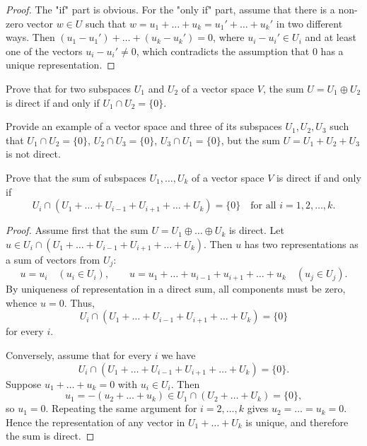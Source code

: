 \begin{proof}
    The "if" part is obvious. For the "only if" part, assume that there is a non-zero vector $w \in U$ such that $w = u_1 + \dots + u_k = u_1' + \dots + u_k'$ in two different ways. Then $(u_1 - u_1') + \dots + (u_k - u_k') = 0$, where $u_i - u_i' \in U_i$ and at least one of the vectors $u_i - u_i' \neq 0$, which contradicts the assumption that $0$ has a unique representation.
\end{proof}

\begin{exercise}
Prove that for two subspaces $U_1$ and $U_2$ of a vector space $V$, the sum $U = U_1 \oplus U_2$ is direct if and only if $U_1 \cap U_2 = \{0\}$.
\end{exercise}

\begin{exercise}
Provide an example of a vector space and three of its subspaces $U_1, U_2, U_3$ such that $U_1\cap U_2 = \{0\}$, $U_2\cap U_3 = \{0\}$, $U_3\cap U_1 = \{0\}$, but the sum $U = U_1+ U_2+ U_3$ is not direct.
\end{exercise}

\begin{lemma}
    Prove that the sum of subspaces $U_1, \ldots, U_k$ of a vector space $V$ is direct if and only if 
    $$
    U_i \cap (U_1 + \dots + U_{i - 1} + U_{i+1} + \dots + U_k) = \{0\} \quad \text{for all } i = 1, 2, \dots, k.
    $$
\end{lemma}

\begin{proof}
Assume first that the sum $U = U_1 \oplus \dots \oplus U_k$ is direct. Let $u \in U_i \cap (U_1 + \dots + U_{i-1} + U_{i+1} + \dots + U_k)$. Then $u$ has two representations as a sum of vectors from $U_j$:
$$
u = u_i \quad (u_i \in U_i), \qquad
u = u_1 + \dots + u_{i-1} + u_{i+1} + \dots + u_k \quad (u_j \in U_j).
$$
By uniqueness of representation in a direct sum, all components must be zero, whence $u = 0$. Thus,
$$
U_i \cap (U_1 + \dots + U_{i-1} + U_{i+1} + \dots + U_k) = \{0\}
$$
for every $i$.

Conversely, assume that for every $i$ we have
$$
U_i \cap (U_1 + \dots + U_{i-1} + U_{i+1} + \dots + U_k) = \{0\}.
$$
Suppose $u_1 + \dots + u_k = 0$ with $u_i \in U_i$. Then
$$
u_1 = -(u_2 + \dots + u_k) \in U_1 \cap (U_2 + \dots + U_k) = \{0\},
$$
so $u_1 = 0$. Repeating the same argument for $i=2,\dots,k$ gives $u_2 = \dots = u_k = 0$. Hence the representation of any vector in $U_1 + \dots + U_k$ is unique, and therefore the sum is direct.
\end{proof}

